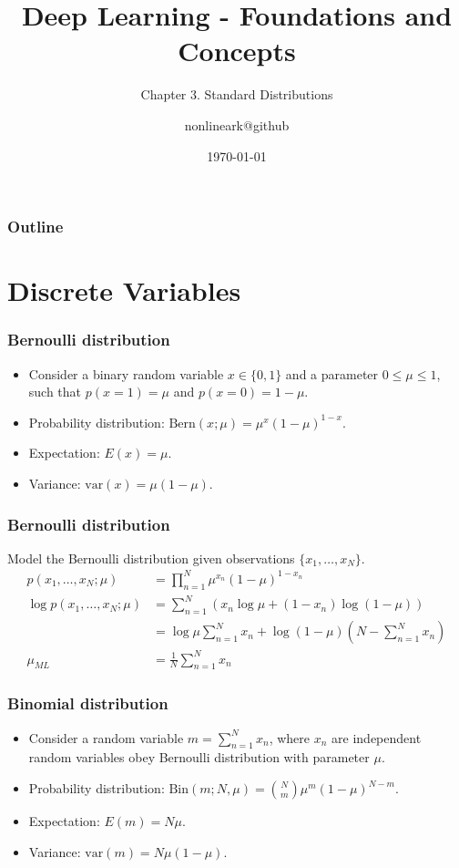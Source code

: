 \documentclass{beamer}
\title{Deep Learning - Foundations and Concepts}
\subtitle{Chapter 3. Standard Distributions}
\author{nonlineark@github}
\date{\today}
\begin{document}
\begin{frame}
    \titlepage
\end{frame}

\begin{frame}
    \frametitle{Outline}
    \tableofcontents
\end{frame}

\section{Discrete Variables}

\begin{frame}
    \frametitle{Bernoulli distribution}
    \begin{itemize}
        \item Consider a binary random variable $x\in\{0,1\}$ and a parameter $0\le\mu\le{}1$, such that $p(x=1)=\mu$ and $p(x=0)=1-\mu$.
        \item Probability distribution: $\mathrm{Bern}(x;\mu)=\mu^{x}(1-\mu)^{1-x}$.
        \item Expectation: $E(x)=\mu$.
        \item Variance: $\mathrm{var}(x)=\mu(1-\mu)$.
    \end{itemize}
\end{frame}

\begin{frame}
    \frametitle{Bernoulli distribution}
    Model the Bernoulli distribution given observations $\{x_{1},\hdots,x_{N}\}$.
    \begin{align*}
        p(x_{1},\hdots,x_{N};\mu)&=\prod_{n=1}^{N}\mu^{x_{n}}(1-\mu)^{1-x_{n}} \\
        \log{}p(x_{1},\hdots,x_{N};\mu)&=\sum_{n=1}^{N}(x_{n}\log\mu+(1-x_{n})\log(1-\mu)) \\
        &=\log\mu\sum_{n=1}^{N}x_{n}+\log(1-\mu)(N-\sum_{n=1}^{N}x_{n}) \\
        \mu_{ML}&=\frac{1}{N}\sum_{n=1}^{N}x_{n}
    \end{align*}
\end{frame}

\begin{frame}
    \frametitle{Binomial distribution}
    \begin{itemize}
        \item Consider a random variable $m=\sum_{n=1}^{N}x_{n}$, where $x_{n}$ are independent random variables obey Bernoulli distribution with parameter $\mu$.
        \item Probability distribution: $\mathrm{Bin}(m;N,\mu)={N\choose{}m}\mu^{m}(1-\mu)^{N-m}$.
        \item Expectation: $E(m)=N\mu$.
        \item Variance: $\mathrm{var}(m)=N\mu(1-\mu)$.
    \end{itemize}
\end{frame}
\end{document}
